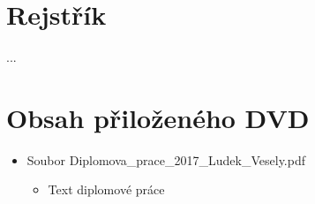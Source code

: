\documentclass[FM,DP]{tulthesis}
\begin{document}
\chapter*{Rejstřík}
...


\appendix

\chapter{Obsah přiloženého DVD}

\begin{itemize}
\item Soubor Diplomova\_prace\_2017\_Ludek\_Vesely.pdf
\begin{itemize}
	\item Text diplomové práce
\end{itemize}

\end{itemize}




\end{document}
